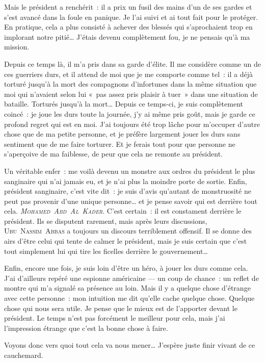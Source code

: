 {	Mais le président a renchérit~:  il a prix un fusil des mains d’un de ses gardes et s’est avancé dans la foule en panique.
	Je l’ai suivi et ai tout fait pour le protéger.  En pratique, cela a plus consisté à achever des blessés qui s’aprochaient trop en implorant notre pitié…
	J’étais devenu complètement fou, je ne pensais qu’à ma mission.

	Depuis ce temps là, il m’a pris dans sa garde d’élite.
	Il me considère comme un de ces guerriers durs, et il attend de moi que je me comporte comme tel~:  il a déjà torturé jusqu’à la mort des compagnons d’infortunes dans la même situation que moi qui n’avaient selon lui «~pas assez pris plaisir à tuer~» dans une situation de bataille.
	Torturés jusqu’à la mort…  Depuis ce temps-ci, je suis complètement coincé~:  je joue les durs toute la journée, j’y ai même pris goût, mais je garde ce profond regret qui est en moi.
	J’ai toujours été trop lâche pour m’occuper d’autre chose que de ma petite personne, et je préfère largement jouer les durs sans sentiment que de me faire torturer.
	Et je ferais tout pour que personne ne s’aperçoive de ma faiblesse, de peur que cela ne remonte au président.

	Un véritable enfer~:  me voilà devenu un monstre aux ordres du président le plus sanginaire qui n’ai jamais eu, et je n’ai plus la moindre porte de sortie.
	Enfin, président sanginaire, c’est vite dit~:  je suis d’avis qu’autant de monstruosité ne peut pas provenir d’une unique personne… et je pense savoir qui est derrière tout cela.
	\emph{\textsc{Mohamed~Abd~Al~Kader}}.  C’est certain~:  il est constament derrière le président.
	Ils se disputent rarement, mais après leurs discussions, \textsc{Ubu~Nassim~Abbas} a toujours un discours terriblement offensif.
	Il se donne des airs d’être celui qui tente de calmer le président, mais je suis certain que c’est tout simplement lui qui tire les ficelles derrière le gouvernement…

	Enfin, encore une fois, je suis loin d’être un héro, à jouer les durs comme cela.
	J’ai d’ailleurs repéré une espionne américaine — un coup de chance~:  un reflet de montre qui m’a signalé sa présence au loin.
	Mais il y a quelque chose d’étrange avec cette personne~:  mon intuition me dit qu’elle cache quelque chose.  Quelque chose qui nous sera utile.
	Je pense que le mieux est de l’apporter devant le président.
	Le temps n’est pas forcément le meilleur pour cela, mais j’ai l’impression étrange que c’est la bonne chose à faire.

	Voyons donc vers quoi tout cela va nous mener…  J’espère juste finir vivant de ce cauchemard.
}

